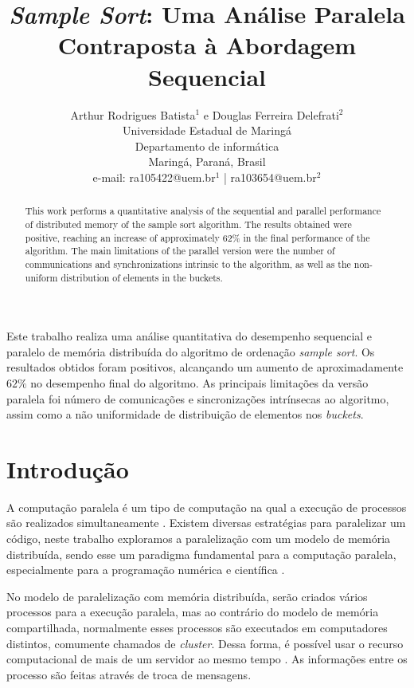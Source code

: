 \documentclass[letterpaper, 10 pt, conference]{ieeeconf}  %
\title{\LARGE \bf
\textit{Sample Sort}: Uma Análise Paralela Contraposta à Abordagem Sequencial}
\author{Arthur Rodrigues Batista$^{1}$ e Douglas Ferreira Delefrati$^{2}$%
 \\Universidade Estadual de Maringá\\
   Departamento de informática\\
   Maringá, Paraná, Brasil
 \\ e-mail: ra105422@uem.br$^{1}$ | ra103654@uem.br$^{2}$
}
\begin{document}
\maketitle
\thispagestyle{empty}
\pagestyle{empty}


\begin{abstract}
This work performs a quantitative analysis of the sequential and parallel performance of distributed memory of the sample sort  algorithm. The results obtained were positive, reaching an increase of approximately 62\% in the final performance of the algorithm. The main limitations of the parallel version were the number of communications and synchronizations intrinsic to the algorithm, as well as the non-uniform distribution of elements in the buckets.

\end{abstract}

\begin{resumo}
Este trabalho realiza uma análise quantitativa do desempenho sequencial e paralelo de memória distribuída do algoritmo de ordenação \textit{sample sort}. Os resultados obtidos foram positivos, alcançando um aumento de aproximadamente $62\%$ no desempenho final do algoritmo. As principais limitações da versão paralela foi número de comunicações e sincronizações intrínsecas ao algoritmo, assim como a não uniformidade de distribuição de elementos nos \textit{buckets}.

\end{resumo}


\section{Introdução}
A computação paralela é um tipo de computação na qual a execução de processos são realizados simultaneamente \cite{c5}. Existem diversas estratégias para paralelizar um código, neste trabalho exploramos a paralelização com um modelo de memória distribuída, sendo esse um paradigma fundamental para a computação paralela, especialmente para a programação numérica e científica \cite{c7}. 

No modelo de paralelização com memória distribuída, serão criados vários processos para a execução paralela, mas ao contrário do modelo de memória compartilhada, normalmente esses processos são executados em computadores distintos, comumente chamados de \textit{cluster}. Dessa forma, é possível usar o recurso computacional de mais de um servidor ao mesmo tempo \cite{c6}. As informações entre os processo são feitas através de troca de mensagens.
 
\end{document}
